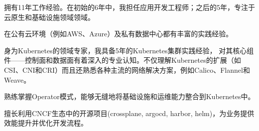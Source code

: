 

\begin{cvparagraph}

拥有11年工作经验。在初始的6年中，我担任应用开发工程师；之后的5年，专注于云原生和基础设施领域领域。

在公有云环境（例如AWS、Azure）及私有数据中心都有丰富的实践经验。

身为Kubernetes的领域专家，我具备5年的Kubernetes集群实践经验， 对其核心组件——控制面和数据面有着深入的专业认知。不仅理解Kubernetes的扩展（如CSI、CNI和CRI）而且还熟悉各种主流的网络解决方案，例如Calico、Flannel和Weave。

熟练掌握Operator模式，能够无缝地将基础设施和运维能力整合到Kubernetes中。

擅长利用CNCF生态中的开源项目(crossplane, argocd, harbor, helm)，为业务提供效能提升并优化开发流程。

\end{cvparagraph}



